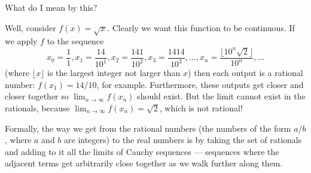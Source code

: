 What do I mean by this?

Well, consider $ f(x) = \sqrt{x} $. Clearly we want this function to be continuous. If we apply $ f $ to the sequence
\begin{displaymath}
  x_0 = \frac{1}{1}, x_1 = \frac{14}{10^1}, x_2 = \frac{141}{10^2}, x_3 = \frac{1414}{10^3}, ..., x_n = \frac{\lfloor 10^n \sqrt{2} \rfloor}{10^n}, ...
\end{displaymath}
(where $ \lfloor x \rfloor $ is the largest integer not larger than $ x $) then each output is a rational number: $ f(x_1) = 14/10 $,
for example. Furthermore, these outputs get closer and closer together so $ \lim_{n \to \infty} f(x_n) $ should exist. But the limit
cannot exist in the rationals, because $ \lim_{n \to \infty} f(x_n) = \sqrt{2} $, which is not rational!

Formally, the way we get from the rational numbers (the numbers of the form $ a/b $, where $ a $ and $ b $ are integers)
to the real numbers is by taking the set of rationals and adding to it all the limits of Cauchy sequences --- sequences
where the adjacent terms get arbitrarily close together as we walk further along them.

